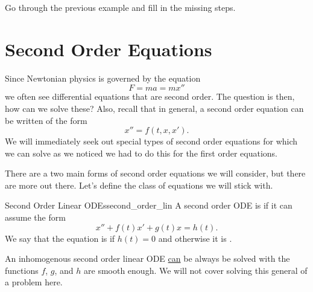         \begin{exercise}
        Go through the previous example and fill in the missing steps.
        \end{exercise}

        \section{Second Order Equations}

        Since Newtonian physics is governed by the equation
        \[
        F=ma=mx''
        \]
        we often see differential equations that are second order.  The question is then, how can we solve these?  Also, recall that in general, a second order equation can be written of the form
        \[
            x'' = f(t,x,x').
        \]
        We will immediately seek out special types of second order equations for which we can solve as we noticed we had to do this for the first order equations.

        There are a two main forms of second order equations we will consider, but there are more out there. Let's define the class of equations we will stick with.

        \begin{df}{Second Order Linear ODEs}{second_order_lin}
            A second order ODE is  if it can assume the form
            \[
            x''+f(t)x'+g(t)x=h(t).
            \]
            We say that the equation is  if $h(t)=0$ and otherwise it is .
        \end{df}

        \begin{remark}
        An inhomogenous second order linear ODE \underline{can} be always be solved with the functions $f$, $g$, and $h$ are smooth enough.  We will not cover solving this general of a problem here.
        \end{remark}

